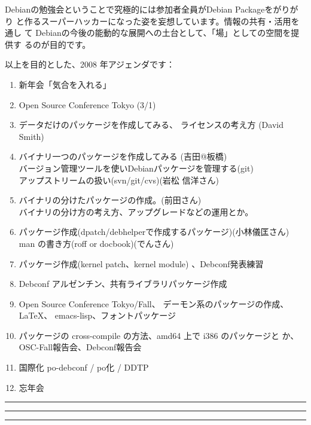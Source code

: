 \documentclass[mingoth,a4paper]{jsarticle}
\begin{document}
 Debianの勉強会ということで究極的には参加者全員がDebian Packageをがりがり
 と作るスーパーハッカーになった姿を妄想しています。情報の共有・活用を通し
 て Debianの今後の能動的な展開への土台として、「場」としての空間を提供す
 るのが目的です。

以上を目的とした、2008 年アジェンダです：
\begin{enumerate}
 \item 新年会「気合を入れる」
 \item Open Source Conference Tokyo (3/1)
 \item データだけのパッケージを作成してみる、
       ライセンスの考え方 (David Smith)
 \item バイナリ一つのパッケージを作成してみる (吉田@板橋)\\
       バージョン管理ツールを使いDebianパッケージを管理する(git)\\
       アップストリームの扱い(svn/git/cvs)(岩松 信洋さん)
 \item バイナリの分けたパッケージの作成。(前田さん)\\
       バイナリの分け方の考え方、アップグレードなどの運用とか。
 \item パッケージ作成(dpatch/debhelperで作成するパッケージ)(小林儀匡さん)\\
       man の書き方(roff or docbook)(でんさん)
 \item パッケージ作成(kernel patch、kernel module)
       、Debconf発表練習
 \item Debconf アルゼンチン、共有ライブラリパッケージ作成

 \item Open Source Conference Tokyo/Fall、
       デーモン系のパッケージの作成、\LaTeX{}、 emacs-lisp、フォントパッケージ
 \item パッケージの cross-compile の方法、amd64 上で i386 のパッケージと
       か、OSC-Fall報告会、Debconf報告会
 \item 国際化 po-debconf / po化 / DDTP
 \item 忘年会
\end{enumerate}


\newpage

\begin{minipage}[b]{0.2\hsize}
 \colorbox{titleback}{}
\end{minipage}
\begin{minipage}[b]{0.8\hsize}
\hrule
\vspace{2mm}
\hrule
\tableofcontents
\vspace{2mm}
\hrule
\end{minipage}
\end{document}
